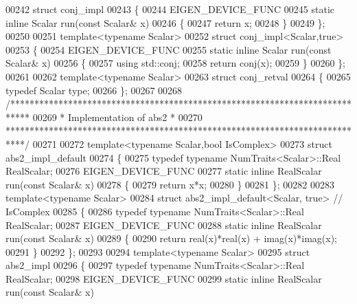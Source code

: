 \begin{DoxyCode}
00242 \textcolor{keyword}{struct }conj\_impl
00243 \{
00244   EIGEN\_DEVICE\_FUNC
00245   \textcolor{keyword}{static} \textcolor{keyword}{inline} Scalar run(\textcolor{keyword}{const} Scalar& x)
00246   \{
00247     \textcolor{keywordflow}{return} x;
00248   \}
00249 \};
00250 
00251 \textcolor{keyword}{template}<\textcolor{keyword}{typename} Scalar>
00252 \textcolor{keyword}{struct }conj\_impl<Scalar,true>
00253 \{
00254   EIGEN\_DEVICE\_FUNC
00255   \textcolor{keyword}{static} \textcolor{keyword}{inline} Scalar run(\textcolor{keyword}{const} Scalar& x)
00256   \{
00257     \textcolor{keyword}{using} std::conj;
00258     \textcolor{keywordflow}{return} conj(x);
00259   \}
00260 \};
00261 
00262 \textcolor{keyword}{template}<\textcolor{keyword}{typename} Scalar>
00263 \textcolor{keyword}{struct }conj\_retval
00264 \{
00265   \textcolor{keyword}{typedef} Scalar type;
00266 \};
00267 
00268 \textcolor{comment}{/****************************************************************************}
00269 \textcolor{comment}{* Implementation of abs2                                                 *}
00270 \textcolor{comment}{****************************************************************************/}
00271 
00272 \textcolor{keyword}{template}<\textcolor{keyword}{typename} Scalar,\textcolor{keywordtype}{bool} IsComplex>
00273 \textcolor{keyword}{struct }abs2\_impl\_default
00274 \{
00275   \textcolor{keyword}{typedef} \textcolor{keyword}{typename} NumTraits<Scalar>::Real RealScalar;
00276   EIGEN\_DEVICE\_FUNC
00277   \textcolor{keyword}{static} \textcolor{keyword}{inline} RealScalar run(\textcolor{keyword}{const} Scalar& x)
00278   \{
00279     \textcolor{keywordflow}{return} x*x;
00280   \}
00281 \};
00282 
00283 \textcolor{keyword}{template}<\textcolor{keyword}{typename} Scalar>
00284 \textcolor{keyword}{struct }abs2\_impl\_default<Scalar, true> \textcolor{comment}{// IsComplex}
00285 \{
00286   \textcolor{keyword}{typedef} \textcolor{keyword}{typename} NumTraits<Scalar>::Real RealScalar;
00287   EIGEN\_DEVICE\_FUNC
00288   \textcolor{keyword}{static} \textcolor{keyword}{inline} RealScalar run(\textcolor{keyword}{const} Scalar& x)
00289   \{
00290     \textcolor{keywordflow}{return} real(x)*real(x) + imag(x)*imag(x);
00291   \}
00292 \};
00293 
00294 \textcolor{keyword}{template}<\textcolor{keyword}{typename} Scalar>
00295 \textcolor{keyword}{struct }abs2\_impl
00296 \{
00297   \textcolor{keyword}{typedef} \textcolor{keyword}{typename} NumTraits<Scalar>::Real RealScalar;
00298   EIGEN\_DEVICE\_FUNC
00299   \textcolor{keyword}{static} \textcolor{keyword}{inline} RealScalar run(\textcolor{keyword}{const} Scalar& x)

\end{DoxyCode}
